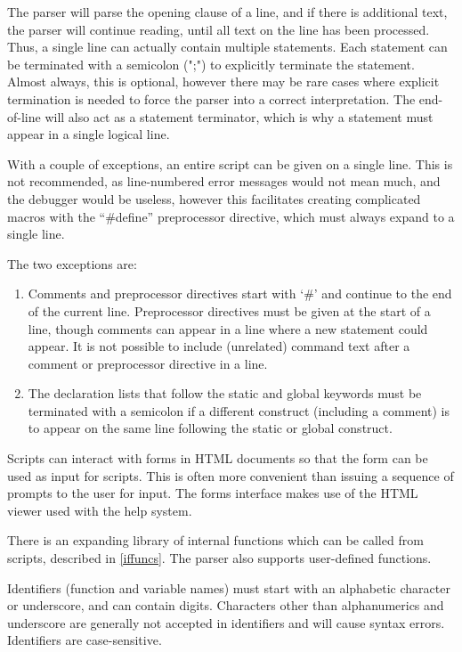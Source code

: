 The parser will parse the opening clause of a line, and if there is
additional text, the parser will continue reading, until all text on
the line has been processed.  Thus, a single line can actually contain
multiple statements.  Each statement can be terminated with a
semicolon ({\vt ";"}) to explicitly terminate the statement.  Almost
always, this is optional, however there may be rare cases where
explicit termination is needed to force the parser into a correct
interpretation.  The end-of-line will also act as a statement
terminator, which is why a statement must appear in a single logical
line.

With a couple of exceptions, an entire script can be given on a single line. 
This is not recommended, as line-numbered error messages would not
mean much, and the debugger would be useless, however this facilitates
creating complicated macros with the ``{\vt \#define}'' preprocessor
directive, which must always expand to a single line.

The two exceptions are:
\begin{enumerate}
\item{Comments and preprocessor directives start with `\#' and
continue to the end of the current line.  Preprocessor directives must
be given at the start of a line, though comments can appear in a line
where a new statement could appear.  It is not possible to include
(unrelated) command text after a comment or preprocessor directive in
a line.}

\item{The declaration lists that follow the {\vt static} and {\vt
global} keywords must be terminated with a semicolon if a different
construct (including a comment) is to appear on the same line
following the {\vt static} or {\vt global} construct.}
\end{enumerate}

Scripts can interact with forms in HTML documents so that the form can
be used as input for {\Xic} scripts.  This is often more convenient
than issuing a sequence of prompts to the user for input.  The forms
interface makes use of the HTML viewer used with the help system.

There is an expanding library of internal functions which can be
called from scripts, described in \ref{iffuncs}.  The parser also
supports user-defined functions.

Identifiers (function and variable names) must start with an
alphabetic character or underscore, and can contain digits. 
Characters other than alphanumerics and underscore are generally not
accepted in identifiers and will cause syntax errors.  Identifiers are
case-sensitive. 

